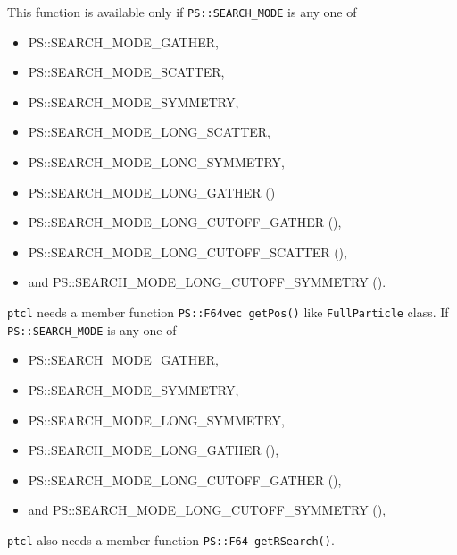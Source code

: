 \begin{itemize}
This function is available only if \texttt{PS::SEARCH\_MODE} is any one of
\begin{itemize}[itemsep=-1ex]
\item PS::SEARCH\_MODE\_GATHER,
\item PS::SEARCH\_MODE\_SCATTER,
\item PS::SEARCH\_MODE\_SYMMETRY,
\item PS::SEARCH\_MODE\_LONG\_SCATTER,
\item PS::SEARCH\_MODE\_LONG\_SYMMETRY,
\item PS::SEARCH\_MODE\_LONG\_GATHER ()
\item PS::SEARCH\_MODE\_LONG\_CUTOFF\_GATHER (),
\item PS::SEARCH\_MODE\_LONG\_CUTOFF\_SCATTER (),
\item and PS::SEARCH\_MODE\_LONG\_CUTOFF\_SYMMETRY ().
\end{itemize}
\texttt{ptcl} needs a member function {\tt PS::F64vec getPos()} like \texttt{FullParticle} class.
If \texttt{PS::SEARCH\_MODE} is any one of
\begin{itemize}[itemsep=-1ex]
\item PS::SEARCH\_MODE\_GATHER,
\item PS::SEARCH\_MODE\_SYMMETRY,
\item PS::SEARCH\_MODE\_LONG\_SYMMETRY,
\item PS::SEARCH\_MODE\_LONG\_GATHER (),
\item PS::SEARCH\_MODE\_LONG\_CUTOFF\_GATHER (),
\item and PS::SEARCH\_MODE\_LONG\_CUTOFF\_SYMMETRY (),
\end{itemize}
\texttt{ptcl} also needs a member function \texttt{PS::F64 getRSearch()}.


\end{itemize}







